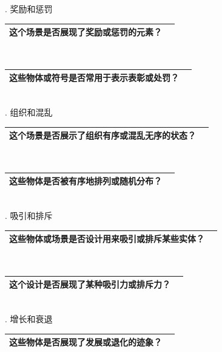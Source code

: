 \documentclass[12pt]{book}
\begin{document}
. 奖励和惩罚

\begin{tabular}{|p{15cm}|p{3cm}|}
	\hline
这个场景是否展现了奖励或惩罚的元素？\\
	\hline
\end{tabular}\\




\begin{tabular}{|p{15cm}|p{3cm}|}
	\hline
这些物体或符号是否常用于表示表彰或处罚？\\
	\hline
\end{tabular}\\



. 组织和混乱

\begin{tabular}{|p{15cm}|p{3cm}|}
	\hline
这个场景是否展示了组织有序或混乱无序的状态？\\
	\hline
\end{tabular}\\



\begin{tabular}{|p{15cm}|p{3cm}|}
	\hline
这些物体是否被有序地排列或随机分布？\\
	\hline
\end{tabular}\\


. 吸引和排斥

\begin{tabular}{|p{15cm}|p{3cm}|}
	\hline
这些物体或场景是否设计用来吸引或排斥某些实体？\\
	\hline
\end{tabular}\\


\begin{tabular}{|p{15cm}|p{3cm}|}
	\hline
这个设计是否展现了某种吸引力或排斥力？\\
	\hline
\end{tabular}\\



. 增长和衰退

\begin{tabular}{|p{15cm}|p{3cm}|}
	\hline
这些物体是否展现了发展或退化的迹象？\\
	\hline
\end{tabular}\\
\end{document}
